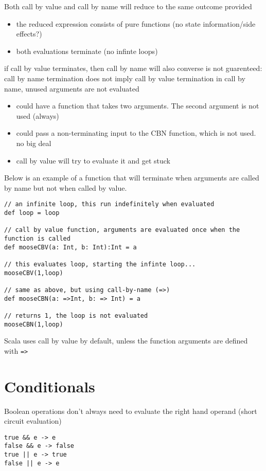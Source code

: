 Both call by value and call by name will reduce to the same outcome provided
\begin{itemize}
  \item the reduced expression consists of pure functions (no state information/side effects?)
  \item both evaluations terminate (no infinte loops)
\end{itemize}

if call by value terminates, then call by name will also
converse is not guarenteed: call by name termination does not imply call by value termination
in call by name, unused arguments are not evaluated
\begin{itemize}
  \item could have a function that takes two arguments. The second argument is not used (always)
  \item could pass a non-terminating input to the CBN function, which is not used. no big deal
  \item call by value will try to evaluate it and get stuck
\end{itemize}

Below is an example of a function that will terminate when arguments are called by name but not when called by value.
\begin{lstlisting}
// an infinite loop, this run indefinitely when evaluated
def loop = loop 

// call by value function, arguments are evaluated once when the function is called
def mooseCBV(a: Int, b: Int):Int = a

// this evaluates loop, starting the infinte loop...
mooseCBV(1,loop)

// same as above, but using call-by-name (=>)
def mooseCBN(a: =>Int, b: => Int) = a

// returns 1, the loop is not evaluated
mooseCBN(1,loop)
\end{lstlisting}

Scala uses call by value by default, unless the function arguments are defined with \verb|=>|


\section{Conditionals}
Boolean operations don't always need to evaluate the right hand operand (short circuit evaluation)

\begin{verbatim}
true && e -> e
false && e -> false
true || e -> true
false || e -> e
\end{verbatim}

